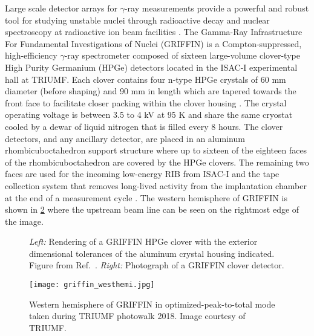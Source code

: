 \documentclass[cnatzke_thesis_proposal.tex]{subfiles}
\begin{document}
Large scale detector arrays for $\gamma$-ray measurements provide a powerful and robust tool for studying unstable nuclei through radioactive decay and nuclear spectroscopy at radioactive ion beam facilities \cite{garnsworthy_griffin_2019}. 
The Gamma-Ray Infrastructure For Fundamental Investigations of Nuclei (GRIFFIN) is a Compton-suppressed, high-efficiency $\gamma$-ray spectrometer composed of sixteen large-volume clover-type High Purity Germanium (HPGe) detectors located in the ISAC-I experimental hall at TRIUMF. 
Each clover contains four n-type HPGe crystals of 60 mm diameter (before shaping) and 90 mm in length which are tapered towards the front face to facilitate closer packing within the clover housing \cite{rizwan_characteristics_2016}.
The crystal operating voltage is between 3.5 to 4 kV at 95 K and share the same cryostat cooled by a dewar of liquid nitrogen that is filled every 8 hours. 
The clover detectors, and any ancillary detector, are placed in an aluminum rhombicuboctahedron support structure where up to sixteen of the eighteen faces of the rhombicuboctahedron are covered by the HPGe clovers.
The remaining two faces are used for the incoming low-energy RIB from ISAC-I and the tape collection system that removes long-lived activity from the implantation chamber at the end of a measurement cycle \cite{garnsworthy_griffin_2019}. 
The western hemisphere of GRIFFIN is shown in \ref{fig:griffin_westhemi} where the upstream beam line can be seen on the rightmost edge of the image. 

\begin{figure}[htbp]
  \centering
  \quad
  \caption{
    \textit{Left:} Rendering of a GRIFFIN HPGe clover with the exterior dimensional tolerances of the aluminum crystal housing indicated. Figure from Ref.~\cite{rizwan_characteristics_2016}.
    \textit{Right:} Photograph of a GRIFFIN clover detector.
  }
  \label{fig:source_holder_in_griffin}
\end{figure}

\begin{center}
  \begin{figure}[htbp]
    \begin{center}
      \texttt{[image: griffin\_westhemi.jpg]}
    \end{center}
    \caption{Western hemisphere of GRIFFIN in optimized-peak-to-total mode taken during TRIUMF photowalk 2018. Image courtesy of TRIUMF.}
    \label{fig:griffin_westhemi}
  \end{figure}
\end{center}
\end{document}
